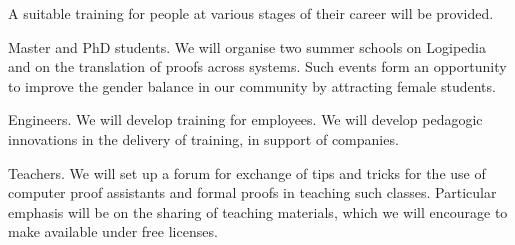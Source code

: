 \begin{workpackage}[id=dissemination,type=MGT,wphases=1-48,
  short={Dissemination},
  title={Dissemination, communication and exploitation},
  lead=Lie,LieRM=3,InrRM=6,BirRM=4,CleRM=2,ImtRM=2,StrRM=2,ZibRM=14,EduRM=12]
\begin{tasklist}
  \begin{task}[id=training,
      title=Training Logipedia developers and users,
      shorttitle=Train.,
      lead=Bir,BirRM=2,wphases=1-48!.05]
    A suitable training for people at various stages of their career will be
    provided.
    \begin{compactitem}
    \item Master and PhD students.
      We will organise two summer schools on Logipedia
      and on the translation of proofs across systems.
      Such events form an
      opportunity to improve the gender balance in our community by
      attracting female students.
    \item Engineers.
      We will develop training for employees.
      We will develop pedagogic innovations in the delivery of training,
      in support of companies.
    \item Teachers.
      We will set up a forum for exchange of tips and tricks for the use
      of computer proof assistants and formal proofs in teaching such classes.
      Particular emphasis will be on the sharing of teaching materials, which
      we will encourage to make available under free licenses.
    \end{compactitem}

  \end{task}


\end{tasklist}
\end{workpackage}
